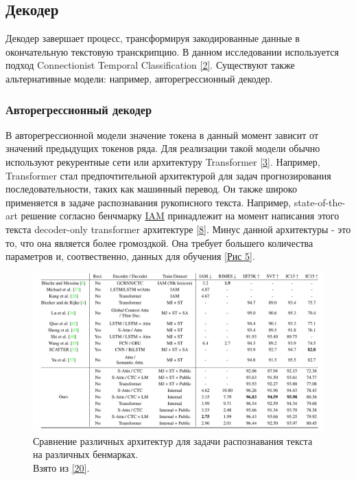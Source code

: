 \subsection{Декодер}
Декодер завершает процесс, трансформируя закодированные данные в окончательную текстовую транскрипцию. В данном исследовании используется подход Connectionist Temporal Classification \hyperlink{cite.Gra06}{[2]}. Существуют также альтернативные модели: например, авторегрессионный декодер. 

\subsubsection{Авторегрессионный декодер}
В авторегрессионной модели значение токена в данный момент зависит от значений предыдущих токенов ряда. Для реализации такой модели обычно используют рекурентные сети или архитектуру Transformer \hyperlink{cite.Vas17}{[3]}. Например, Transformer стал предпочтительной архитектурой для задач прогнозирования последовательности, таких как машинный перевод. Он также широко применяется в задаче распознавания рукописного текста. Например, state-of-the-art решение согласно бенчмарку \href{https://paperswithcode.com/sota/handwritten-text-recognition-on-iam}{IAM} принадлежит на момент написания этого текста decoder-only transformer архитектуре \hyperlink{cite.Mas23}{[8]}. Минус данной архитектуры - это то, что она является более громоздкой. Она требует большего количества параметров и, соотвественно, данных для обучения \hyperlink{image5}{[Рис 5]}.

\begin{figure}
    \centering
    \includegraphics[scale=0.25]{./images/competition_all.png}
    \caption{\protect\hypertarget{image6}{Сравнение различных архитектур для задачи распознавания текста на различных бенмарках. \\ Взято из \protect\hyperlink{cite.Her21}{[20]}}.}
\end{figure}

